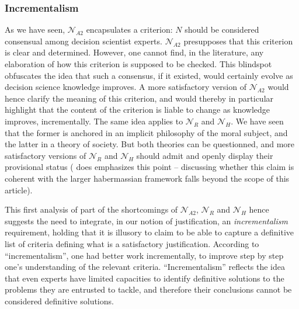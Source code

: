 \documentclass[preprint, french, english, 11pt, authoryear]{elsarticle}%
\begin{document}
\subsubsection{Incrementalism}
As we have seen, $\mathscr{N}_{A2}$ encapsulates a criterion: $N$ should be considered consensual among decision scientist experts. $\mathscr{N}_{A2}$ presupposes that this criterion is clear and determined. However, one cannot find, in the literature, any elaboration of how this criterion is supposed to be checked. This blindspot obfuscates the idea that such a consensus, if it existed, would certainly evolve as decision science knowledge improves. A more satisfactory version of $\mathscr{N}_{A2}$ would hence clarify the meaning of this criterion, and would thereby in particular highlight that the content of the criterion is liable to change as knowledge improves, incrementally. The same idea applies to $\mathscr{N}_{R}$ and $\mathscr{N}_{H}$. We have seen that the former is anchored in an implicit philosophy of the moral subject, and the latter in a theory of society. But both theories can be questionned, and more satisfactory versions of $\mathscr{N}_{R}$ and $\mathscr{N}_{H}$ should admit and openly display their provisional status (\cite{habermas_moralbewustsein_1983} does emphasizes this point -- discussing whether this claim is coherent with the larger habermassian framework falls beyond the scope of this article).

This first analysis of part of the shortcomings of $\mathscr{N}_{A2}$, $\mathscr{N}_{R}$ and $\mathscr{N}_{H}$ hence suggests the need to integrate, in our notion of justification, an \emph{incrementalism} requirement, holding that it is illusory to claim to be able to capture a definitive list of criteria defining what is a satisfactory justification. According to “incrementalism”, one had better work incrementally, to improve step by step one's understanding of the relevant criteria. “Incrementalism” reflects the idea that even experts have limited capacities to identify definitive solutions to the problems they are entrusted to tackle, and therefore their conclusions cannot be considered definitive solutions.
\end{document}
